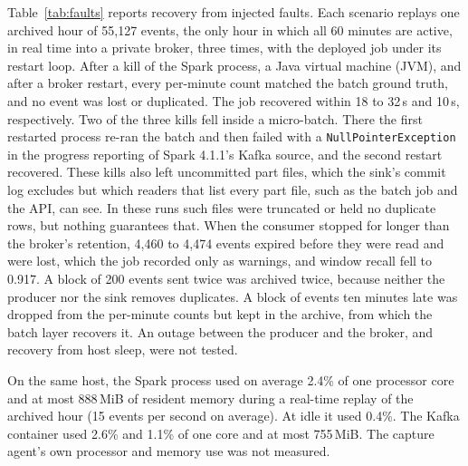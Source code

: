 \documentclass[sensors,article,submit,pdftex,oneauthor]{Definitions/mdpi}
\begin{document}
Table~\ref{tab:faults} reports recovery from injected faults. Each scenario replays one archived hour of 55,127 events, the only hour in which all 60 minutes are active, in real time into a private broker, three times, with the deployed job under its restart loop. After a kill of the Spark process, a Java virtual machine (JVM), and after a broker restart, every per-minute count matched the batch ground truth, and no event was lost or duplicated. The job recovered within 18 to 32\,s and 10\,s, respectively. Two of the three kills fell inside a micro-batch. There the first restarted process re-ran the batch and then failed with a \texttt{NullPointerException} in the progress reporting of Spark 4.1.1's Kafka source, and the second restart recovered. These kills also left uncommitted part files, which the sink's commit log excludes but which readers that list every part file, such as the batch job and the API, can see. In these runs such files were truncated or held no duplicate rows, but nothing guarantees that. When the consumer stopped for longer than the broker's retention, 4,460 to 4,474 events expired before they were read and were lost, which the job recorded only as warnings, and window recall fell to 0.917. A block of 200 events sent twice was archived twice, because neither the producer nor the sink removes duplicates. A block of events ten minutes late was dropped from the per-minute counts but kept in the archive, from which the batch layer recovers it. An outage between the producer and the broker, and recovery from host sleep, were not tested.



On the same host, the Spark process used on average 2.4\% of one processor core and at most 888\,MiB of resident memory during a real-time replay of the archived hour (15 events per second on average). At idle it used 0.4\%. The Kafka container used 2.6\% and 1.1\% of one core and at most 755\,MiB. The capture agent's own processor and memory use was not measured.
\end{document}
